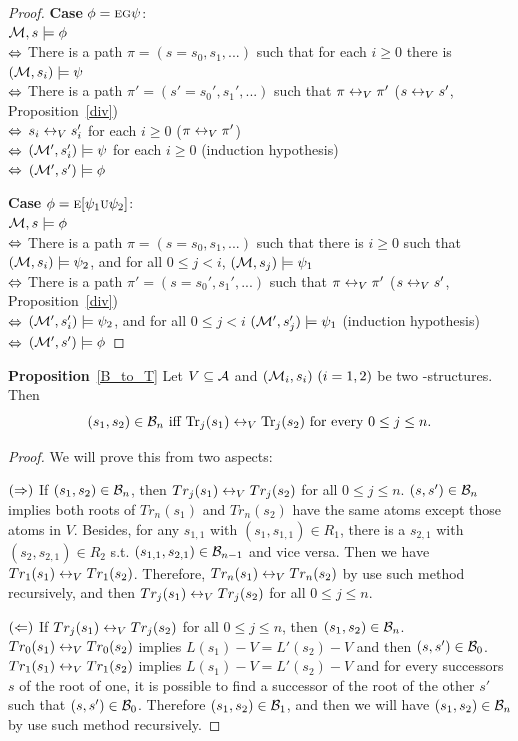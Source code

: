 \documentclass{article}
\begin{document}
\begin{proof}
\textbf{Case} $\phi = \textsc{e} \textsc{g} \psi$:\\
${\cal M}, s \models \phi$ \\
$\Leftrightarrow$ There is a path $\pi =(s=s_0, s_1, ...)$ such that for each $i \geq 0$ there is $({\cal M}, s_i) \models \psi$\\
$\Leftrightarrow$ There is a path $\pi' = (s'=s_0', s_1', ...)$ such that $\pi \leftrightarrow_V \pi'$   \hfill ($s \leftrightarrow_V s'$, Proposition~\ref{div})\\
$\Leftrightarrow$ $s_i \leftrightarrow_V s_i'$ for each $i \geq 0$ \hfill ($\pi \leftrightarrow_V \pi'$)\\
$\Leftrightarrow$ $({\cal M}', s_i') \models \psi$ for each $i \geq 0$  \hfill  (induction hypothesis)\\
$\Leftrightarrow$ $({\cal M}', s') \models \phi$

\textbf{Case} $\phi = \textsc{e} [\psi_1 \textsc{u} \psi_2]$:\\
${\cal M}, s \models \phi$ \\
$\Leftrightarrow$ There is a path $\pi= (s=s_0, s_1, ...)$ such that there is $i \geq 0$ such that $({\cal M}, s_i) \models \psi_2$, and for all $0 \leq j < i$, $({\cal M}, s_j) \models \psi_1$\\
$\Leftrightarrow$ There is a path $\pi' = (s=s_0', s_1', ...)$ such that $\pi \leftrightarrow_V \pi'$  \hfill  ($s \leftrightarrow_V s'$, Proposition~\ref{div})\\
$\Leftrightarrow$ $({\cal M}', s_i') \models \psi_2$, and for all $0 \leq j < i$ $({\cal M}', s_j') \models \psi_1$   \hfill   (induction hypothesis)\\
$\Leftrightarrow$ $({\cal M}', s') \models \phi$
\end{proof}


\textbf{Proposition}~\ref{B_to_T}  Let $V\subseteq\cal A$ and $({\cal M}_i,s_i)~(i=1,2)$ be two \MPK-structures.
  Then
  \[(s_1,s_2)\in{\cal B}_n\mbox{ iff }
  \textrm{Tr}_j(s_1)\leftrightarrow_V\textrm{Tr}_j(s_2)\mbox{ for every $0\le j\le n$}.\]
\begin{proof}
We will prove this from two aspects:

$(\Rightarrow)$ If $(s_1, s_2) \in {\cal B}_n$, then $Tr_j(s_1) \leftrightarrow_V Tr_j(s_2)$ for all $0 \leq j \leq n$. $(s, s') \in {\cal B}_n$ implies both roots of $Tr_n(s_1)$ and $Tr_n(s_2)$ have the same atoms except those atoms in $V$.
Besides, for any $s_{1,1}$ with $(s_1, s_{1,1}) \in R_1$, there is a $s_{2,1}$ with $(s_2, s_{2,1})\in R_2$ s.t. $(s_{1,1}, s_{2,1}) \in {\cal B}_{n-1}$ and vice versa.
Then we have $Tr_1(s_1) \leftrightarrow_V Tr_1(s_2)$.
Therefore,  $Tr_n(s_1) \leftrightarrow_V Tr_n(s_2)$ by use such method recursively, and then $Tr_j(s_1) \leftrightarrow_V Tr_j(s_2)$ for all $0 \leq j \leq n$.

$(\Leftarrow)$ If $Tr_j(s_1) \leftrightarrow_V Tr_j(s_2)$ for all $0\leq j \leq n$, then $(s_1, s_2) \in {\cal B}_n$.
$Tr_0(s_1) \leftrightarrow_V Tr_0(s_2)$ implies $L(s_1) - V = L'(s_2) - V$ and then $(s, s') \in {\cal B}_0$.
$Tr_1(s_1) \leftrightarrow_V Tr_1(s_2)$ implies $L(s_1) - V = L'(s_2)- V$ and for every successors $s$ of the root of one, it is possible to find a successor of the root of the other $s'$ such that
$(s, s')\in {\cal B}_0$. Therefore $(s_1, s_2) \in {\cal B}_1$, and then we will have $(s_1, s_2) \in {\cal B}_n$ by use such method recursively.
\end{proof}
\end{document}
